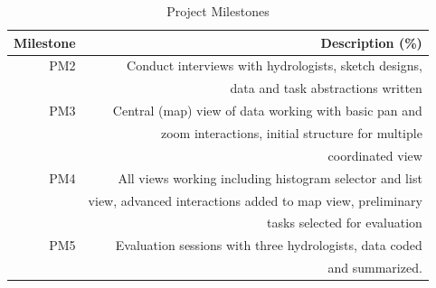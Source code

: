 \begin{table}[h]
 \caption{Project Milestones}\vspace{1ex} %
 \label{tab:milestones}
 \scriptsize
 \centering %
   \begin{tabular}{r|r}
     Milestone & Description (\%)\\
   \hline
     PM2 & Conduct interviews with hydrologists, sketch designs, \\
         & data and task abstractions written\\
     PM3 & Central (map) view of data working with basic pan and \\
         & zoom interactions, initial structure for multiple \\
	 & coordinated view\\
     PM4 & All views working including histogram selector and list \\
	 & view, advanced interactions added to map view, preliminary \\
	 & tasks selected for evaluation \\
     PM5 & Evaluation sessions with three hydrologists, data coded \\
         & and summarized.\\
   \end{tabular}
\end{table}


